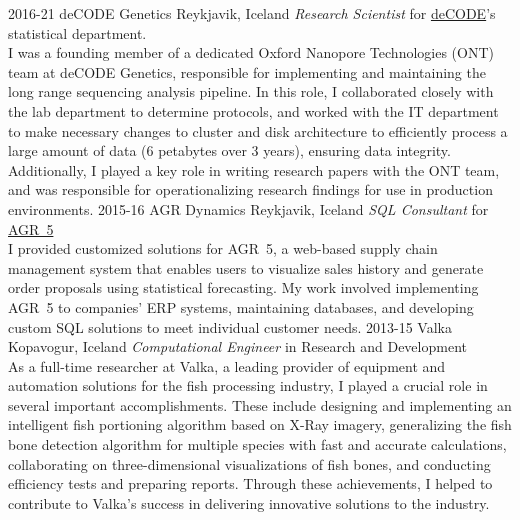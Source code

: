\begin{entrylist}
\entry
{2016-21}
{deCODE Genetics}
{Reykjavik, Iceland}
{\emph{Research Scientist} for \href{https://www.decode.com/}{deCODE}'s statistical department.\\
I was a founding member of a dedicated Oxford Nanopore Technologies (ONT) team at deCODE Genetics, responsible for implementing and maintaining the long range sequencing analysis pipeline. In this role, I collaborated closely with the lab department to determine protocols, and worked with the IT department to make necessary changes to cluster and disk architecture to efficiently process a large amount of data (6 petabytes over 3 years), ensuring data integrity. Additionally, I played a key role in writing research papers with the ONT team, and was responsible for operationalizing research findings for use in production environments.
}
\entry
{2015-16}
{AGR Dynamics}
{Reykjavik, Iceland}
{\emph{SQL Consultant} for \href{http://agrdynamics.com/}{AGR~5}\\
I provided customized solutions for AGR~5, a web-based supply chain management system that enables users to visualize sales history and generate order proposals using statistical forecasting. My work involved implementing AGR~5 to companies' ERP systems, maintaining databases, and developing custom SQL solutions to meet individual customer needs.
}    
\entry
{2013-15}
{Valka}
{Kopavogur, Iceland}
{\emph{Computational Engineer} in Research and Development \\
As a full-time researcher at Valka, a leading provider of equipment and automation solutions for the fish processing industry, I played a crucial role in several important accomplishments. These include designing and implementing an intelligent fish portioning algorithm based on X-Ray imagery, generalizing the fish bone detection algorithm for multiple species with fast and accurate calculations, collaborating on three-dimensional visualizations of fish bones, and conducting efficiency tests and preparing reports. Through these achievements, I helped to contribute to Valka's success in delivering innovative solutions to the industry.
}
\end{entrylist}
